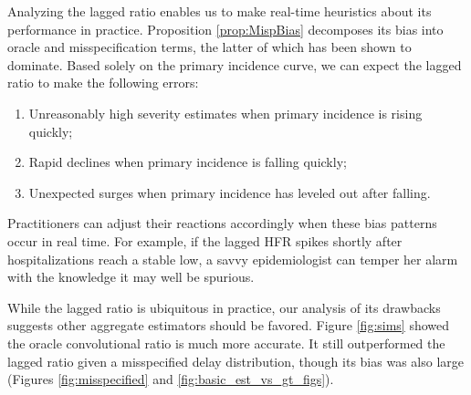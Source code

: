 \documentclass{article}
\begin{document}
Analyzing the lagged ratio enables us to make real-time heuristics about its performance in practice. Proposition \ref{prop:MispBias} decomposes its bias into oracle and misspecification terms, the latter of which has been shown to dominate. Based solely on the primary incidence curve, we can expect the lagged ratio to make the following errors:
\begin{enumerate}
    \item Unreasonably high severity estimates when primary incidence is rising quickly;
    \item Rapid declines when primary incidence is falling quickly;
    \item Unexpected surges when primary incidence has leveled out after falling. 
\end{enumerate}

Practitioners can adjust their reactions accordingly when these bias patterns occur in real time. For example, if the lagged HFR spikes shortly after hospitalizations reach a stable low, a savvy epidemiologist can temper her alarm with the knowledge it may well be spurious.

While the lagged ratio is ubiquitous in practice, our analysis of its
drawbacks suggests other aggregate estimators should be favored. Figure
\ref{fig:sims} showed the oracle convolutional ratio is much more
accurate. 
It still outperformed the lagged ratio given a misspecified delay distribution, though its bias was also large (Figures \ref{fig:misspecified} and \ref{fig:basic_est_vs_gt_figs}).


\end{document}
